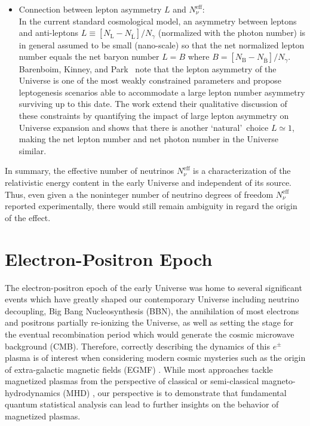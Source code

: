\documentclass[universe,article,submit,moreauthors,pdftex,a4paper]{Definitions/mdpi}
\begin{document}
\begin{itemize}
\item Connection between lepton asymmetry $L$ and $N_\nu^{\mathrm{eff}}$:\\
In the current standard cosmological model, an asymmetry between leptons and anti-leptons $L\equiv  [N_\mathrm{L}-N_{\overline{\mathrm{L}}}] /N_\gamma $  (normalized with the photon number) is in general assumed to be small (nano-scale) so that the net normalized lepton number equals the net baryon number $L=B$ where $B=[N_\mathrm{B}-N_{\overline{\mathrm{B}}}]/N_\gamma $. Barenboim, Kinney, and Park~\cite{Barenboim:2016shh,Barenboim:2017dfq}  note that the lepton asymmetry of the Universe is one of the most weakly constrained parameters and propose leptogenesis scenarios able to accommodate a large lepton number asymmetry surviving up to this date. The work \cite{Yang:2018oqg}  extend their qualitative discussion of these constraints by quantifying the impact of large lepton asymmetry on Universe expansion and shows that there is another \lq natural\rq\ choice  $L\simeq 1$, making the  net lepton number and net photon number in the Universe similar. 

\end{itemize}
In summary, the effective number of neutrinos $N_\nu^{\mathrm{eff}}$ is a characterization of the relativistic energy content
in the early Universe and independent of its source. Thus, even given a the noninteger number of neutrino degrees of freedom $N_\nu^{\mathrm{eff}}$ reported experimentally, there would still remain ambiguity in regard the origin of the effect.
\section{Electron-Positron Epoch}\label{sec:ElectronPositron}
\noindent The electron-positron epoch of the early Universe was home to several significant events which have greatly shaped our contemporary Universe including neutrino decoupling, Big Bang Nucleosynthesis (BBN), the annihilation of most electrons and positrons partially re-ionizing the Universe, as well as setting the stage for the eventual recombination period which would generate the cosmic microwave background (CMB). Therefore, correctly describing the dynamics of this $e^{\pm}$ plasma is of interest when considering modern cosmic mysteries such as the origin of extra-galactic magnetic fields (EGMF) \cite{Anchordoqui:2001bs,Neronov:2010gir}. While most approaches tackle magnetized plasmas from the perspective of classical or semi-classical magneto-hydrodynamics (MHD) \cite{berezhiani1992influence,berezhiani1995large,Schlickeiser:2018hzq}, our perspective is to demonstrate that fundamental quantum statistical analysis can lead to further insights on the behavior of magnetized plasmas.
\end{document}
